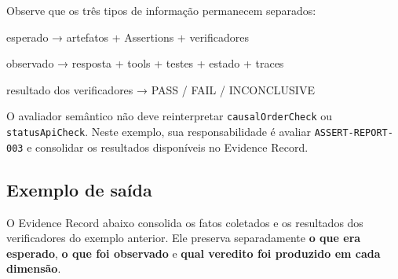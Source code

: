 \documentclass[
  10pt,
  a4paper,
  oneside]{book}
\newenvironment{Shaded}{}{}
\newcommand{\NormalTok}[1]{#1}
\renewenvironment{Shaded}{\begin{snugshade}}{\end{snugshade}}%
\begin{document}
Observe que os três tipos de informação permanecem separados:

\begin{Shaded}
\begin{Highlighting}[]
\NormalTok{esperado}
\NormalTok{→ artefatos + Assertions + verificadores}

\NormalTok{observado}
\NormalTok{→ resposta + tools + testes + estado + traces}

\NormalTok{resultado dos verificadores}
\NormalTok{→ PASS / FAIL / INCONCLUSIVE}
\end{Highlighting}
\end{Shaded}

O avaliador semântico não deve reinterpretar \texttt{causalOrderCheck}
ou \texttt{statusApiCheck}. Neste exemplo, sua responsabilidade é
avaliar \texttt{ASSERT-REPORT-003} e consolidar os resultados
disponíveis no Evidence Record.

\hypertarget{exemplo-de-sauxedda}{%
\subsection{Exemplo de saída}\label{exemplo-de-sauxedda}}

O Evidence Record abaixo consolida os fatos coletados e os resultados
dos verificadores do exemplo anterior. Ele preserva separadamente
\textbf{o que era esperado}, \textbf{o que foi observado} e \textbf{qual
veredito foi produzido em cada dimensão}.
\end{document}

